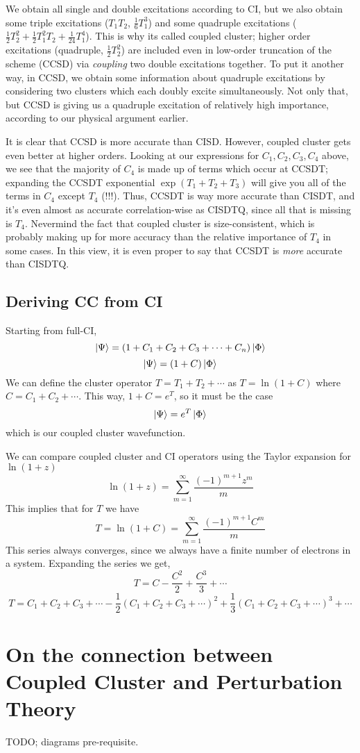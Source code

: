 \documentclass{article}
\newcommand{\lp}{\left(}
\newcommand{\rp}{\right)}
\begin{document}
We obtain all single and double excitations according to CI, but we also
obtain some triple excitations ($T_1 T_2$, $\frac{1}{6} T_1^3$) and some quadruple 
excitations ($\frac{1}{2} T_2^2 + \frac{1}{2} T_1^2 T_2 + \frac{1}{24} T_1^4 $).
This is why its called coupled cluster; higher order excitations 
(quadruple, $\frac{1}{2}T_2^2$) are included even in low-order truncation
of the scheme (CCSD) via \textit{coupling} two double excitations together.
To put it another way, in CCSD, we obtain some information about quadruple excitations 
by considering two clusters which each doubly excite simultaneously. 
Not only that, but CCSD is giving us a quadruple excitation of relatively high importance,
according to our physical argument earlier. 

It is clear that CCSD is more accurate than CISD.
However, coupled cluster gets even better at higher orders. 
Looking at our expressions for $C_1, C_2, C_3, C_4$ above,
we see that the majority of $C_4$ is made up of terms which 
occur at CCSDT; expanding the CCSDT exponential 
$\exp(T_1 + T_2 + T_3)$ will give you all of the terms in $C_4$ except 
$T_4$ (!!!).
Thus, CCSDT is way more accurate than CISDT, and it's even 
almost as accurate correlation-wise as CISDTQ, since all that is missing is $T_4$.
Nevermind the fact  that coupled cluster is size-consistent, which is 
probably making up for more accuracy than the relative importance of $T_4$ in some cases.
In this view, it is even proper to say that CCSDT is \textit{more} accurate than CISDTQ.


\subsection{Deriving CC from CI}
Starting from full-CI,
\[ \ket{\Psi} = \lp 1 + C_1 + C_2 + C_3 + \cdots + C_n \rp \ket{\Phi} \]
\[ \ket{\Psi} = \lp 1 + C \rp \ket{\Phi} \]
We can define the cluster operator $T = T_1 + T_2 + \cdots$ as $T = \ln(1+C)$ where $C = C_1 + C_2 + \cdots$.
This way, $1 + C = e^T$, so it must be the case 
\[\ket{\Psi} = e^T \ket{\Phi} \]
which is our coupled cluster wavefunction.

We can compare coupled cluster and CI operators using the Taylor expansion for $\ln (1 + z)$
\[ \ln (1 + z) = \sum_{m=1}^{\infty} \frac{ (-1)^{m+1}  z^m}{ m} \]
This implies that for $T$ we have 
\[ T = \ln (1 + C) = \sum_{m=1}^{\infty} \frac{(-1)^{m+1}  C^m}{m} \]
This series always converges, since we always have a finite number of electrons in a system.
Expanding the series we get,
\[T = C - \frac{C^2}{2} + \frac{C^3}{3} + \cdots \]
\[T = C_1 + C_2 + C_3 + \cdots -  \frac{1}{2} ( C_1 + C_2 + C_3 + \cdots)^2 +  
  \frac{1}{3} (C_1 + C_2 + C_3 + \cdots)^3 +  \cdots
\]



\section{On the connection between Coupled Cluster and Perturbation Theory}
TODO; diagrams pre-requisite.
\end{document}
